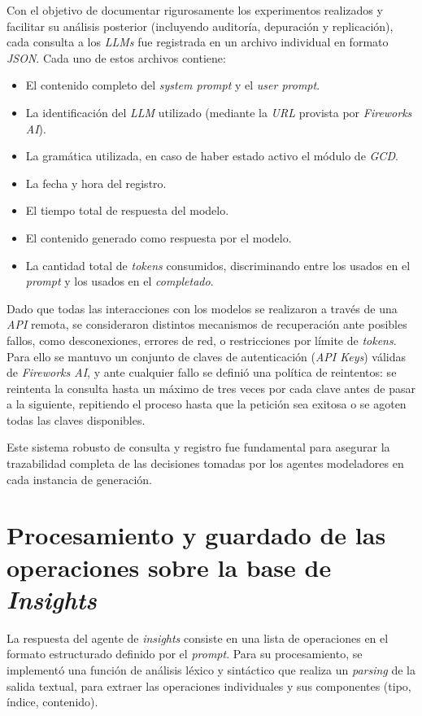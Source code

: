 Con el objetivo de documentar rigurosamente los experimentos realizados y facilitar su análisis posterior (incluyendo auditoría, depuración y replicación), cada consulta a los \textit{LLMs} fue registrada en un archivo individual en formato \textit{JSON}. Cada uno de estos archivos contiene:

\begin{itemize}
    \item El contenido completo del \textit{system prompt} y el \textit{user prompt}.
    \item La identificación del \textit{LLM} utilizado (mediante la \textit{URL} provista por \textit{Fireworks AI}).
    \item La gramática utilizada, en caso de haber estado activo el módulo de \textit{GCD}.
    \item La fecha y hora del registro.
    \item El tiempo total de respuesta del modelo.
    \item El contenido generado como respuesta por el modelo.
    \item La cantidad total de \textit{tokens} consumidos, discriminando entre los usados en el \textit{prompt} y los usados en el \textit{completado}.
\end{itemize}

Dado que todas las interacciones con los modelos se realizaron a través de una \textit{API} remota, se consideraron distintos mecanismos de recuperación ante posibles fallos, como desconexiones, errores de red, o restricciones por límite de \textit{tokens}. Para ello se mantuvo un conjunto de claves de autenticación (\textit{API Keys}) válidas de \textit{Fireworks AI}, y ante cualquier fallo se definió una política de reintentos: se reintenta la consulta hasta un máximo de tres veces por cada clave antes de pasar a la siguiente, repitiendo el proceso hasta que la petición sea exitosa o se agoten todas las claves disponibles.

Este sistema robusto de consulta y registro fue fundamental para asegurar la trazabilidad completa de las decisiones tomadas por los agentes modeladores en cada instancia de generación.

\section{Procesamiento y guardado de las operaciones sobre la base de \textit{Insights}}

La respuesta del agente de \textit{insights} consiste en una lista de operaciones en el formato estructurado definido por el \textit{prompt}. Para su procesamiento, se implementó una función de análisis léxico y sintáctico que realiza un \textit{parsing} de la salida textual, para extraer las operaciones individuales y sus componentes (tipo, índice, contenido).

